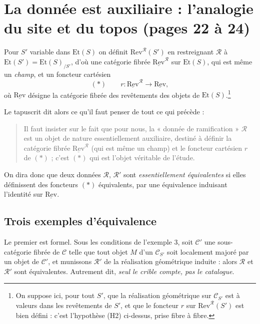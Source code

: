 \documentclass[11pt,a4paper]{article}
\begin{document}
\section*{La donnée est auxiliaire : l'analogie du site et du topos (pages 22 à 24)}

Pour $S'$ variable dans $\mathrm{Et}(S)$ on définit
$\mathrm{Rev}^{\mathcal{R}}(S')$ en restreignant $\mathcal{R}$ à
$\mathrm{Et}(S') = \mathrm{Et}(S)_{/S'}$, d'où une catégorie fibrée
$\underline{\mathrm{Rev}}^{\mathcal{R}}$ sur $\mathrm{Et}(S)$, qui est même
un \emph{champ}, et un foncteur cartésien
\[
  (\ast) \qquad
  r : \underline{\mathrm{Rev}}^{\mathcal{R}} \longrightarrow
  \underline{\mathrm{Rev}} ,
\]
où $\underline{\mathrm{Rev}}$ désigne la catégorie fibrée des revêtements des
objets de $\mathrm{Et}(S)$.\footnote{On suppose ici, pour tout $S'$, que la
réalisation géométrique sur $\mathcal{C}_{S'}$ est à valeurs dans les
revêtements de $S'$, et que le foncteur $r$ sur
$\mathrm{Rev}^{\mathcal{R}}(S')$ est bien défini : c'est l'hypothèse (H2)
ci-dessus, prise fibre à fibre.}

Le tapuscrit dit alors ce qu'il faut penser de tout ce qui précède :

\begin{quote}
Il faut insister sur le fait que pour nous, la « donnée de ramification »
$\mathcal{R}$ est un objet de nature essentiellement auxiliaire, destiné à
définir la catégorie fibrée $\underline{\mathrm{Rev}}^{\mathcal{R}}$ (qui est
même un champ) et le foncteur cartésien $r$ de $(\ast)$ ; c'est $(\ast)$ qui
est l'objet véritable de l'étude.
\end{quote}

On dira donc que deux données $\mathcal{R}$, $\mathcal{R}'$ sont
\emph{essentiellement équivalentes} si elles définissent des foncteurs $(\ast)$
équivalents, par une équivalence induisant l'identité sur
$\underline{\mathrm{Rev}}$.

\subsection*{Trois exemples d'équivalence}

Le premier est formel. Sous les conditions de l'exemple 3, soit $\mathcal{C}'$
une sous-catégorie fibrée de $\mathcal{C}$ telle que tout objet $M$ d'un
$\mathcal{C}_{S'}$ soit localement majoré par un objet de $\mathcal{C}'$, et
munissons $\mathcal{R}'$ de la réalisation géométrique induite : alors
$\mathcal{R}$ et $\mathcal{R}'$ sont équivalentes. Autrement dit,
\emph{seul le crible compte, pas le catalogue}.
\end{document}
